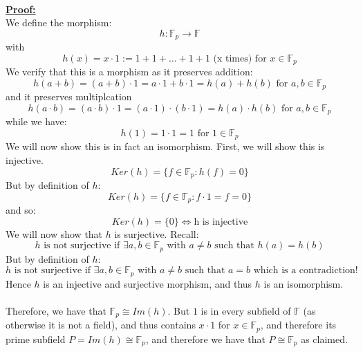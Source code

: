 \documentclass[11pt]{article}
\theoremstyle{plain}
\theoremstyle{definition}
\begin{document}
\\
\textbf{\underline{Proof:}} \\
We define the morphism: 
\begin{equation*}
h: \mathbb{F}_p \rightarrow \mathbb{F} 
\end{equation*} 
with
\begin{equation*}
h(x) = x\cdot 1 := 1+1+\ldots+1 +1 \text{ (x times) for } x \in   \mathbb{F}_p
\end{equation*} 
We verify that this is a morphism as it preserves addition:
\begin{equation*}
h(a+b) = (a+b) \cdot 1 = a\cdot 1 + b \cdot 1 = h(a) + h(b) \text{ for } a,b \in   \mathbb{F}_p
\end{equation*} 
and it preserves multiplcation
\begin{equation*}
h(a\cdot b) = (a \cdot b)\cdot 1 = (a \cdot 1)\cdot (b\cdot 1) = h(a) \cdot h(b) \text{ for } a,b \in   \mathbb{F}_p
\end{equation*} 
while we have:
\begin{equation*}
h(1) = 1 \cdot 1 = 1 \text{ for } 1 \in   \mathbb{F}_p
\end{equation*} 
We will now show this is in fact an isomorphism. First, we will show this is injective.
\begin{equation*}
Ker(h) = \{ f \in \mathbb{F}_p : h(f) = 0 \}
\end{equation*} 
But by definition of $h$:
\begin{equation*}
Ker(h) = \{ f \in \mathbb{F}_p : f \cdot 1 = f = 0 \}
\end{equation*} 
and so:
\begin{equation*}
Ker(h) = \{0\} \iff \text{h is injective}
\end{equation*} 
We will now show that $h$ is surjective. Recall:
\begin{equation*}
h\text{ is not surjective if } \exists a, b \in \mathbb{F}_p\text{ with } a\neq b \text{ such that } h(a)=h(b)
\end{equation*}
But by definition of $h$:
\begin{equation*}
h\text{ is not surjective if } \exists a, b \in \mathbb{F}_p\text{ with } a\neq b \text{ such that } a=b \text{ which is a contradiction!}
\end{equation*}
Hence $h$ is an injective and surjective morphism, and thus $h$ is an isomorphism.\\
\\
Therefore, we have that $\mathbb{F}_p \cong Im(h)$. But $1$ is in every subfield of $\mathbb{F}$ (as otherwise it is not a field), and thus contains $x \cdot 1$ for $x \in \mathbb{F}_p$, and therefore its prime subfield $P = Im(h) \cong \mathbb{F}_p$, and therefore we have that $P \cong \mathbb{F}_p$ as claimed.\\
\end{document}
